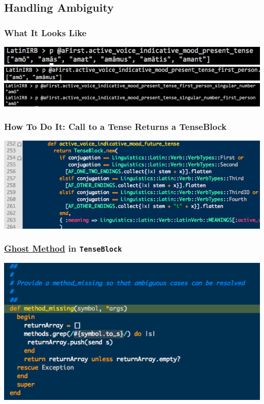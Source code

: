 \documentclass[slidestop,compress,mathserif]{beamer}
\begin{document}
\subsection{Handling Ambiguity} %
\label{sub:methods}

\begin{frame}
	\frametitle{What It Looks Like}

	\includegraphics[scale=0.35]{img/flexibility_1.png}	
	\vskip 0.5cm
	\includegraphics[scale=0.35]{img/flexibility_2.png}	
	\vskip 0.5cm
	\includegraphics[scale=0.30]{img/flexibility_3.png}	
\end{frame}

\begin{frame}
	\frametitle{How To Do It:  Call to a Tense Returns a TenseBlock}
	\begin{center}
		\includegraphics[scale=0.45]{img/tense_method_call.png}
	\end{center}
\end{frame}

\begin{frame}
	\frametitle{\underline{Ghost Method} in \texttt{TenseBlock}}
	\includegraphics[scale=0.45]{img/tenseblock_mm.png}
\end{frame}
\end{document}
